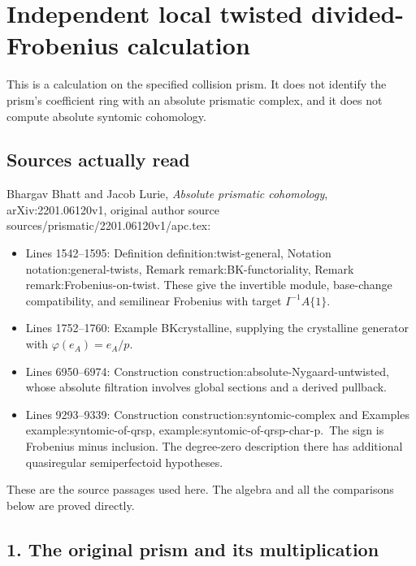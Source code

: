 \documentclass[
  10pt,
]{article}
\author{}
\date{}
\providecommand{\tightlist}{%
  \setlength{\itemsep}{0pt}\setlength{\parskip}{0pt}}
\begin{document}
\section{Independent local twisted divided-Frobenius
calculation}\label{independent-local-twisted-divided-frobenius-calculation}

This is a calculation on the specified collision prism. It does not
identify the prism's coefficient ring with an absolute prismatic
complex, and it does not compute absolute syntomic cohomology.

\subsection{Sources actually read}\label{sources-actually-read}

Bhargav Bhatt and Jacob Lurie, \emph{Absolute prismatic cohomology},
arXiv:2201.06120v1, original author source
sources/prismatic/2201.06120v1/apc.tex:

\begin{itemize}
\tightlist
\item
  Lines 1542--1595: Definition definition:twist-general, Notation
  notation:general-twists, Remark remark:BK-functoriality, Remark
  remark:Frobenius-on-twist. These give the invertible module,
  base-change compatibility, and semilinear Frobenius with target
  \(I^{-1}A\{1\}\).
\item
  Lines 1752--1760: Example BKcrystalline, supplying the crystalline
  generator with \(\varphi(e_A)=e_A/p\).
\item
  Lines 6950--6974: Construction
  construction:absolute-Nygaard-untwisted, whose absolute filtration
  involves global sections and a derived pullback.
\item
  Lines 9293--9339: Construction construction:syntomic-complex and
  Examples example:syntomic-of-qrsp,
  example:syntomic-of-qrsp-char-p.~The sign is Frobenius minus
  inclusion. The degree-zero description there has additional
  quasiregular semiperfectoid hypotheses.
\end{itemize}

These are the source passages used here. The algebra and all the
comparisons below are proved directly.

\subsection{1. The original prism and its
multiplication}\label{the-original-prism-and-its-multiplication}
\end{document}
